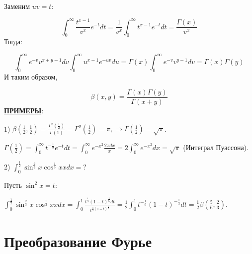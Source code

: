 \documentclass[12pt]{article}
\begin{document}
Заменим $uv = t$:\par
$$\int_0^\infty \frac{t^{x-1}}{v^{x}} e^{-t} dt = \frac{1}{v^x} \int_0^\infty t^{x-1} e^{-t} dt = \frac{\Gamma(x)}{v^x}$$
Тогда:\par
$$\int_0^\infty e^{-v} v^{x+y-1} dv \int_0^\infty u^{x-1} e^{-uv} du = \Gamma(x) \int_0^\infty e^{-v} v^{y-1} dv = \Gamma(x) \Gamma(y)$$
И таким образом,\par
$$\beta(x,y) = \frac{\Gamma(x) \Gamma(y)}{\Gamma(x+y)}$$
\uline{\textbf{ПРИМЕРЫ}}:\par
1) $\beta(\frac{1}{2}, \frac{1}{2}) = \frac{\Gamma^2(\frac{1}{2})}{\Gamma(1)} = \Gamma^2(\frac{1}{2}) = \pi, \Rightarrow \Gamma(\frac{1}{2}) = \sqrt{\pi}$.\par
$\Gamma(\frac{1}{2}) = \int_0^\infty t^{-\frac{1}{2}} e^{-t} dt = \int_0^\infty e^{-x^2} \frac{2x dx}{x} = 2\int_0^\infty e^{-x^2} dx = \sqrt{\pi}$ (Интеграл Пуассона).\par
2) $\int_0^{\frac{1}{2}} \sin^{\frac{2}{3}}{x} \cos^{\frac{1}{3}}{x} x dx = ?$\par
Пусть $\sin^2{x} = t$:\par
$\int_0^{\frac{1}{2}} \sin^{\frac{2}{3}}{x} \cos^{\frac{1}{3}}{x} x dx = \int_0^1 \frac{t^{\frac{1}{3}} (1-t)^{\frac{1}{6}}dt}{t^{\frac{1}{2} (1-t)^{\frac{1}{2}}}} = \frac{1}{2} \int_0^1 t^{-\frac{1}{6}} (1-t)^{-\frac{1}{3}} dt = \frac{1}{2} \beta(\frac{5}{6}, \frac{2}{3})$.\par
\section{Преобразование Фурье}
\end{document}
